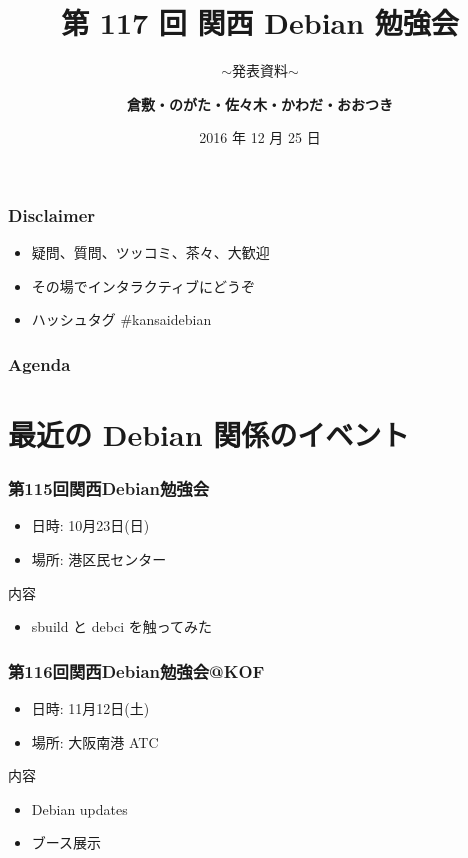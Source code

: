 \documentclass[cjk,dvipdfmx,10pt,compress,%
hyperref={bookmarks=true,bookmarksnumbered=true,bookmarksopen=false,%
colorlinks=false,%
pdftitle={第 117 回 関西 Debian 勉強会},%
pdfauthor={倉敷・のがた・佐々木・かわだ・おおつき},%
pdfsubject={資料},%
}]{beamer}
\title{第 117 回 関西 Debian 勉強会}
\subtitle{$\sim$発表資料$\sim$}
\author[かわだ てつたろう]{{\large\bf 倉敷・のがた・佐々木・かわだ・おおつき}}
\institute[Debian JP]{{\normalsize\tt 関西 Debian 勉強会}}
\date{{\small 2016 年 12 月 25 日}}
\begin{document}
\settitleslide
\begin{frame}
\titlepage
\end{frame}
\setdefaultslide

\begin{frame}[fragile]
  \frametitle{Disclaimer}
  \begin{itemize}
  \item 疑問、質問、ツッコミ、茶々、\alert{大歓迎}
  \item その場でインタラクティブにどうぞ
  \item ハッシュタグ \#kansaidebian
  \end{itemize}
\end{frame}

\begin{frame}[fragile]
\frametitle{Agenda}

\tableofcontents

\end{frame}

\section{最近の Debian 関係のイベント}


\begin{frame}[fragile]
  \frametitle{第115回関西Debian勉強会}
  \begin{itemize}
  \item 日時: 10月23日(日)
  \item 場所: 港区民センター
  \end{itemize}
  \begin{block}{内容}
    \begin{itemize}
    \item sbuild と debci を触ってみた
    \end{itemize}
  \end{block}
\end{frame}

\begin{frame}[fragile]
  \frametitle{第116回関西Debian勉強会@KOF}
  \begin{itemize}
  \item 日時: 11月12日(土)
  \item 場所: 大阪南港 ATC
  \end{itemize}
  \begin{block}{内容}
    \begin{itemize}
    \item Debian updates
    \item ブース展示
    \end{itemize}
  \end{block}
\end{frame}
\end{document}

